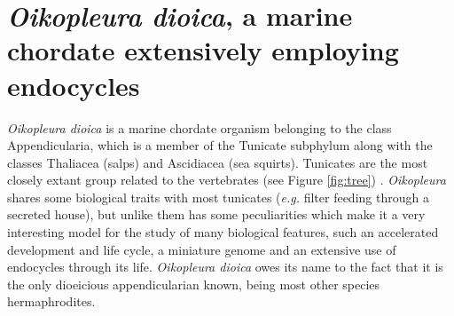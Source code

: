 \documentclass[11pt,twoside,a4paper]{report}
\begin{document}
	\clearpage
	\section{\textit{Oikopleura dioica}, a marine chordate extensively employing endocycles}
		\textit{Oikopleura dioica} is a marine  chordate organism belonging to the class Appendicularia, which is a member of the Tunicate subphylum along with the classes Thaliacea (salps) and Ascidiacea (sea squirts). Tunicates are the most closely extant group related to the vertebrates (see Figure \ref{fig:tree}) \cite{Delsuc2006}. \textit{Oikopleura} shares some biological traits with most tunicates (\textit{e.g.} filter feeding through a secreted house), but unlike them has some peculiarities which make it a very interesting model for the study of many biological features, such an accelerated development and life cycle, a miniature genome and an extensive use of endocycles through its life. \textit{Oikopleura dioica} owes its name to the fact that it is the only dioeicious appendicularian known, being most other species hermaphrodites.
		
\end{document}
